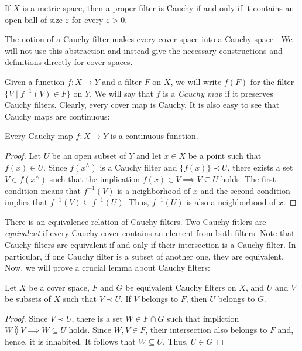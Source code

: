 \documentclass[reqno]{amsart}
\theoremstyle{definition}
\theoremstyle{remark}
\numberwithin{figure}{section}
\newcommand{\overlap}[2]{#1 \between #2}
\newcommand{\rb}{\prec}
\begin{document}
\begin{cor}
If $X$ is a metric space, then a proper filter is Cauchy if and only if it contains an open ball of size $\varepsilon$ for every $\varepsilon > 0$.
\end{cor}

The notion of a Cauchy filter makes every cover space into a Cauchy space \cite[Definition~1.3.1]{cauchy-spaces}.
We will not use this abstraction and instead give the necessary constructions and definitions directly for cover spaces.

Given a function $f : X \to Y$ and a filter $F$ on $X$, we will write $f(F)$ for the filter $\{ V \mid f^{-1}(V) \in F \}$ on $Y$.
We will say that $f$ is a \emph{Cauchy map} if it preserves Cauchy filters.
Clearly, every cover map is Cauchy.
It is also easy to see that Cauchy maps are continuous:

\begin{prop}
Every Cauchy map $f : X \to Y$ is a continuous function.
\end{prop}
\begin{proof}
Let $U$ be an open subset of $Y$ and let $x \in X$ be a point such that $f(x) \in U$.
Since $f(x^\wedge)$ is a Cauchy filter and $\{ f(x) \} \rb U$, there exists a set $V \in f(x^\wedge)$ such that the implication $f(x) \in V \implies V \subseteq U$ holds.
The first condition means that $f^{-1}(V)$ is a neighborhood of $x$ and the second condition implies that $f^{-1}(V) \subseteq f^{-1}(U)$.
Thus, $f^{-1}(U)$ is also a neighborhood of $x$.
\end{proof}

There is an equivalence relation of Cauchy filters.
Two Cauchy fitlers are \emph{equivalent} if every Cauchy cover contains an element from both filters.
Note that Cauchy filters are equivalent if and only if their intersection is a Cauchy filter.
In particular, if one Cauchy filter is a subset of another one, they are equivalent.
Now, we will prove a crucial lemma about Cauchy filters:

\begin{lem}
Let $X$ be a cover space, $F$ and $G$ be equivalent Cauchy filters on $X$, and $U$ and $V$ be subsets of $X$ such that $V \rb U$.
If $V$ belongs to $F$, then $U$ belongs to $G$.
\end{lem}
\begin{proof}
Since $V \rb U$, there is a set $W \in F \cap G$ such that impliction $\overlap{W}{V} \implies W \subseteq U$ holds.
Since $W,V \in F$, their intersection also belongs to $F$ and, hence, it is inhabited.
It follows that $W \subseteq U$.
Thus, $U \in G$
\end{proof}
\end{document}
